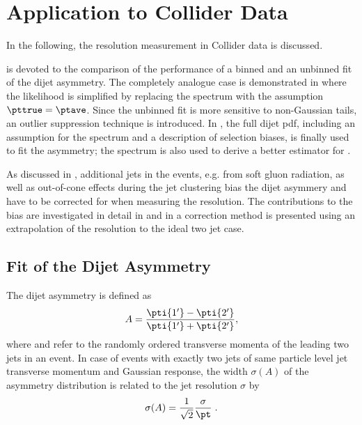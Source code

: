 \section{Application to Collider Data}\label{sec:ResFit:DataDriven}

In the following, the resolution measurement in Collider data is
discussed.

 is devoted to the comparison of the performance of a
binned and an unbinned fit of the dijet asymmetry.
The completely analogue case is demonstrated in
 where the likelihood is simplified by replacing the spectrum
with the assumption \mbox{$\pttrue = \ptave$}.
Since the unbinned fit is more sensitive to non-Gaussian tails, an outlier
suppression technique is introduced.
In , the full dijet pdf, including an assumption for the
spectrum and a description of selection biases, is finally used to fit the asymmetry;
the spectrum is also used to derive a better estimator for \ptgen.

As discussed in , additional jets in the events, e.g. from soft gluon radiation, as
well as out-of-cone effects during the jet clustering bias the dijet asymmery and have to be
corrected for when measuring the resolution.
The contributions to the bias are investigated in detail in  and
in  a correction method is presented using an extrapolation of
the resolution to the ideal two jet case.


\subsection{Fit of the Dijet Asymmetry}\label{sec:ResFit:Asym}

The dijet asymmetry is defined as
\begin{equation}\label{eq:ResFit:Asymmetry}
  A = \frac{\pti{1'}-\pti{2'}}{\pti{1'}+\pti{2'}},
\end{equation}
where  and  refer to the randomly ordered transverse momenta of the
leading two jets in an event.
In case of events with exactly two jets of same particle level jet
transverse momentum \pt and Gaussian response, the width $\sigma(A)$ of the asymmetry distribution is
related to the jet \pt resolution $\sigma$ by
\begin{equation}
  \label{eq:ResFit:ResFromAsym}
  \sigma(A) = \frac{1}{\sqrt{2}}\frac{\sigma}{\pt} \; .
\end{equation}


